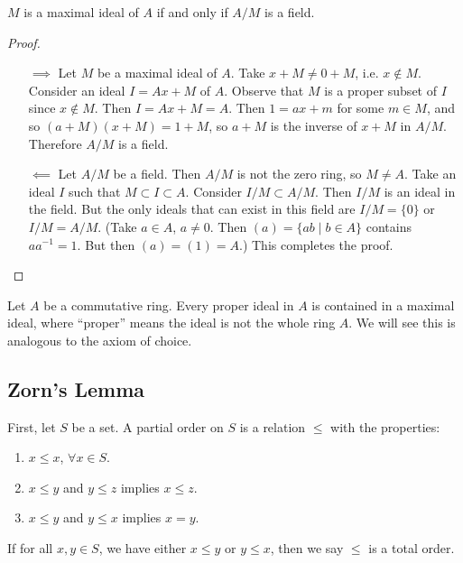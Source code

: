 \begin{prop}
$M$ is a maximal ideal of $A$ if and only if $A / M$ is a field.
\end{prop}

\begin{proof}
\begin{itemize}
  \item[$\implies$]
  {
    Let $M$ be a maximal ideal of $A$. Take $x + M \neq 0 + M$,
    i.e. $x \notin M$. Consider an ideal $I = A x + M$ of $A$. Observe
    that $M$ is a proper subset of $I$ since $x \notin M$. Then
    $I = Ax + M = A$. Then $1 = a x + m$ for some $m \in M$, and so
    $(a + M)(x + M) = 1 + M$, so $a + M$ is the inverse of $x + M$ in
    $A / M$. Therefore $A / M$ is a field.
  }
  \item[$\impliedby$]
  {
    Let $A / M$ be a field. Then $A / M$ is not the zero ring, so
    $M \neq A$. Take an ideal $I$ such that $M \subset I \subset
    A$. Consider $I / M \subset A / M$. Then $I / M$ is an ideal in
    the field. But the only ideals that can exist in this field
    are $I / M = \{ 0 \}$ or $I / M = A / M$. (Take $a \in A$,
    $a \neq 0$. Then $(a) = \{ ab \mid b \in A \}$ contains $a a^{-1}
    = 1$. But then $(a) = (1) = A$.) This completes the proof.
  }
\end{itemize}
\end{proof}

\begin{theorem}[?]
Let $A$ be a commutative ring. Every proper ideal in $A$ is contained
in a maximal ideal, where ``proper'' means the ideal is not the whole
ring $A$. We will see this is analogous to the axiom of choice.
\end{theorem}

\subsection{Zorn's Lemma}
First, let $S$ be a set. A partial order on $S$ is a relation $\leq$
with the properties:
\begin{enumerate}
\item{
  $x \leq x$, $\forall x \in S$.
}
\item{
  $x \leq y$ and $y \leq z$ implies $x \leq z$.
}
\item{
  $x \leq y$ and $y \leq x$ implies $x = y$.
}
\end{enumerate}

If for all $x, y \in S$, we have either $x \leq y$ or $y \leq x$, then
we say $\leq$ is a total order.

